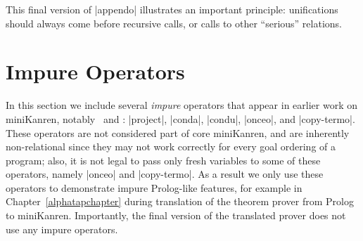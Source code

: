 \noindent This final version of \scheme|appendo| illustrates an
important principle: unifications should always come before recursive
calls, or calls to other ``serious'' relations.







\section{Impure Operators}\label{impureoperatorssection}

In this section we include several \emph{impure} operators that appear
in earlier work on miniKanren, notably~\citet{trs} and
\citet{DBLP:conf/iclp/NearBF08}: \scheme|project|, \scheme|conda|,
\scheme|condu|, \scheme|onceo|, and \scheme|copy-termo|.  These
operators are not considered part of core miniKanren, and are
inherently non-relational since they may not work correctly for every
goal ordering of a program; also, it is not legal to pass only fresh
variables to some of these operators, namely \scheme|onceo| and
\scheme|copy-termo|.  As a result we only use these operators to
demonstrate impure Prolog-like features, for example in
Chapter~\ref{alphatapchapter} during translation of the \leantapsp
theorem prover from Prolog to miniKanren.  Importantly, the final
version of the translated prover does not use any impure operators.

